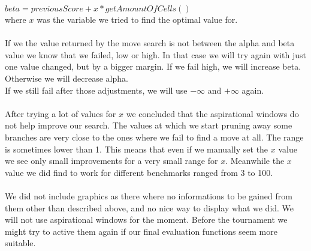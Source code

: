 $beta = previousScore + x*getAmountOfCells()$\\
where $x$ was the variable we tried to find the optimal value for.\\\\
If we the value returned by the move search is not between the alpha and beta value we know that we failed, low or high. In that case we will try again with just one value changed, but by a bigger margin. If we fail high, we will increase beta. Otherwise we will decrease alpha.\\ If we still fail after those adjustments, we will use $-\infty$ and $+\infty$ again.\\\\
After trying a lot of values for $x$ we concluded that the aspirational windows do not help improve our search. The values at which we start pruning away some branches are very close to the ones where we fail to find a move at all. The range is sometimes lower than 1. This means that even if we manually set the $x$ value we see only small improvements for a very small range for $x$. Meanwhile the $x$ value we did find to work for different benchmarks ranged from 3 to 100.\\\\
We did not include graphics as there where no informations to be gained from them other than described above, and no nice way to display what we did. We will not use aspirational windows for the moment. Before the tournament we might try to active them again if our final evaluation functions seem more suitable.

